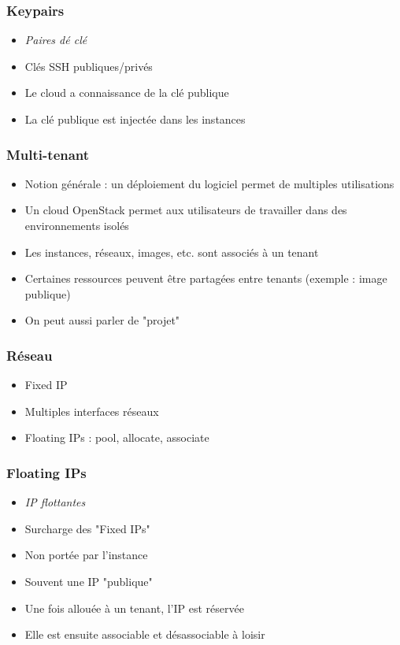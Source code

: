   \begin{frame}
    \frametitle{Keypairs}
    \begin{itemize}
      \item \textit{Paires dé clé}
      \item Clés SSH publiques/privés
      \item Le cloud a connaissance de la clé publique
      \item La clé publique est injectée dans les instances
    \end{itemize}
  \end{frame}

  \begin{frame}
    \frametitle{Multi-tenant}
    \begin{itemize}
      \item Notion générale : un déploiement du logiciel permet de multiples utilisations
      \item Un cloud OpenStack permet aux utilisateurs de travailler dans des environnements isolés
      \item Les instances, réseaux, images, etc. sont associés à un tenant
      \item Certaines ressources peuvent être partagées entre tenants (exemple : image publique)
      \item On peut aussi parler de "projet"
    \end{itemize}
  \end{frame}

  \begin{frame}
    \frametitle{Réseau}
    \begin{itemize}
      \item Fixed IP
      \item Multiples interfaces réseaux
      \item Floating IPs : pool, allocate, associate
    \end{itemize}
  \end{frame}

  \begin{frame}
    \frametitle{Floating IPs}
    \begin{itemize}
      \item \textit{IP flottantes}
      \item Surcharge des "Fixed IPs"
      \item Non portée par l'instance
      \item Souvent une IP "publique"
      \item Une fois allouée à un tenant, l'IP est réservée
      \item Elle est ensuite associable et désassociable à loisir
    \end{itemize}
  \end{frame}

